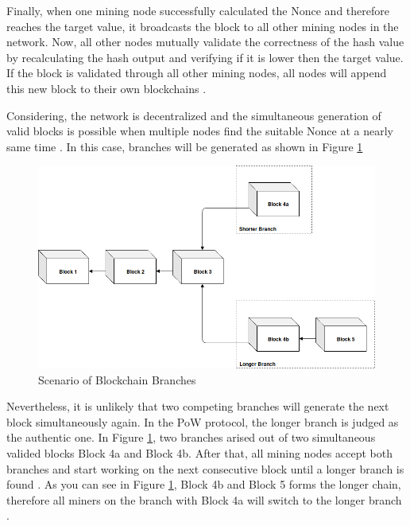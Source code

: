 Finally, when one mining node successfully calculated the Nonce and therefore reaches the target value, 
it broadcasts the block to all other mining nodes in the network. Now, all other nodes mutually validate the correctness of the hash value
by recalculating the hash output and verifying if it is lower then the target value. 
If the block is validated through all other mining nodes, all nodes will append this new block to their own blockchains .  

Considering, the network is decentralized and the simultaneous generation of valid blocks is possible when multiple nodes find 
the suitable Nonce at a nearly same time . In this case, branches will be generated as shown in Figure \ref{figure:blockchain_branches}

\begin{figure}[htbp]
	\centering
	\includegraphics[width=.9\linewidth]{./figures/blockchain_branches.png}
	\caption{Scenario of Blockchain Branches}
	\label{figure:blockchain_branches}
\end{figure}

Nevertheless, it is unlikely that two competing branches will generate the next block simultaneously again. 
In the PoW protocol, the longer branch is judged as the authentic one. 
In Figure \ref{figure:blockchain_branches}, two branches arised out of 
two simultaneous valided blocks Block 4a and Block 4b. 
After that, all mining nodes accept both branches and start working on 
the next consecutive block until a longer branch is found . 
As you can see in Figure \ref{figure:blockchain_branches}, Block 4b and Block 5 forms the longer 
chain, therefore all miners on the branch with Block 4a will switch to 
the longer branch . 

